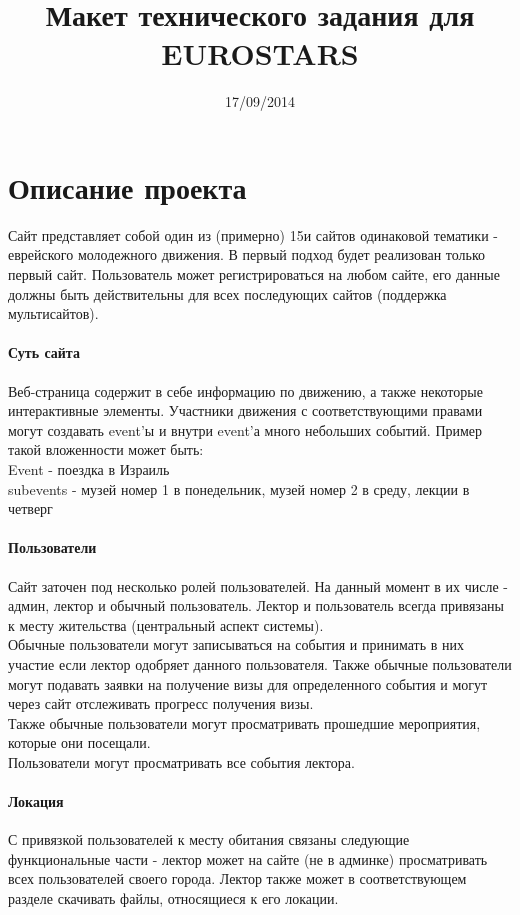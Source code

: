 \documentclass[DIV=calc, paper=a4, fontsize=11pt]{scrartcl} %
\title{Макет технического задания для EUROSTARS}
\date{17/09/2014}
\begin{document}
\maketitle

\section{Описание проекта}
Сайт представляет собой один из (примерно) 15и сайтов одинаковой тематики - еврейского молодежного движения. В первый подход будет реализован только первый сайт. Пользователь может регистрироваться на любом сайте, его данные должны быть действительны для всех последующих сайтов (поддержка мультисайтов).
\paragraph{Суть сайта}
Веб-страница содержит в себе информацию по движению, а также некоторые интерактивные элементы. Участники движения с соответствующими правами могут создавать event'ы и внутри event'а много небольших событий. Пример такой вложенности может быть:
\\ Event - поездка в Израиль
\\ subevents - музей номер 1 в понедельник, музей номер 2 в среду, лекции в четверг
\paragraph{Пользователи}
Сайт заточен под несколько ролей пользователей. На данный момент в их числе - админ, лектор и обычный пользователь. Лектор и пользователь всегда привязаны к месту жительства (центральный аспект системы).
\\[0.5cm]
Обычные пользователи могут записываться на события и принимать в них участие если лектор одобряет данного пользователя. Также обычные пользователи могут подавать заявки на получение визы для определенного события и могут через сайт отслеживать прогресс получения визы.
\\[0.5cm]
Также обычные пользователи могут просматривать прошедшие мероприятия, которые они посещали.
\\[0.5cm]
Пользователи могут просматривать все события лектора.
\paragraph{Локация}
С привязкой пользователей к месту обитания связаны следующие функциональные части - лектор может на сайте (не в админке) просматривать всех пользователей своего города. Лектор также может в соответствующем разделе скачивать файлы, относящиеся к его локации.
\end{document}
